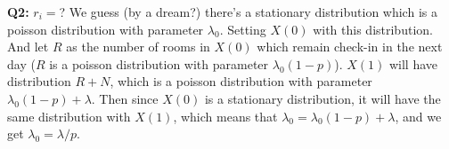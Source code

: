 \documentclass{beamer}
\begin{document}
\begin{frame}{\textbf{Q2:} $r_i =$?}
	We guess (by a dream?) there's a stationary distribution which is a poisson distribution with parameter $\lambda_0$.
	Setting $X(0)$ with this distribution. 
	And let $R$ as the number of rooms in $X(0)$ which remain check-in in the next day ($R$ is a poisson distribution with parameter $\lambda_0 (1-p)$).
	$X(1)$ will have distribution $R + N$, which is a poisson distribution with parameter $\lambda_0 (1-p) + \lambda$.
	Then since $X(0)$ is a stationary distribution, it will have the same distribution with $X(1)$, which means that $\lambda_0 = \lambda_0 (1-p) + \lambda$, and we get $\lambda_0 = \lambda / p$.
\end{frame}
\end{document}

